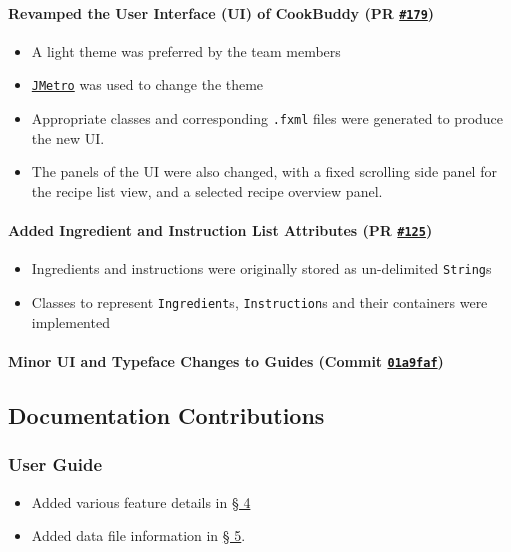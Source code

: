 \documentclass[11pt,british]{article}
\begin{document}
\paragraph{Revamped the User Interface (UI) of CookBuddy (PR \href{https://github.com/AY1920S2-CS2103T-W12-4/main/pull/179}{\texttt{\#179}}) }
\begin{itemize}
	\item A light theme was preferred by the team members
	\item \href{https://pixelduke.com/java-javafx-theme-jmetro/}{\texttt{JMetro}} was used to change the theme
	\item Appropriate classes and corresponding \texttt{.fxml} files were generated to produce the new UI.
	\item The panels of the UI were also changed, with a fixed scrolling side panel for the recipe list view, and a selected recipe overview panel.
\end{itemize}

\paragraph{Added Ingredient and Instruction List Attributes (PR \href{https://github.com/AY1920S2-CS2103T-W12-4/main/pull/125}{\texttt{\#125}}) }
\begin{itemize}
	\item Ingredients and instructions were originally stored as un-delimited \texttt{String}s
	\item Classes to represent \texttt{Ingredient}s, \texttt{Instruction}s and their containers were implemented
\end{itemize}

\paragraph{Minor UI and Typeface Changes to Guides (Commit \href{https://github.com/AY1920S2-CS2103T-W12-4/main/pull/319/commits/01a9faffe83f12997f9eba13a2b92e6f4322167d}{\texttt{01a9faf}}) }

\subsection{Documentation Contributions}
\subsubsection{User Guide}
\begin{itemize}
	\item Added various feature details in \href{https://ay1920s2-cs2103t-w12-4.github.io/main/UserGuide.html#features}{\S{} 4}
	\item Added data file information in \href{https://ay1920s2-cs2103t-w12-4.github.io/main/UserGuide.html#configuration-and-recipe-data-sharadh}{\S{} 5}.
\end{itemize}
\end{document}
